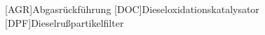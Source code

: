 
\label{sec:abkuerzungsverzeichnis}


\begin{acronym}
	[AGR]{Abgasrückführung}
	[DOC]{Dieseloxidationskatalysator}
	[DPF]{Dieselrußpartikelfilter}
\end{acronym}
